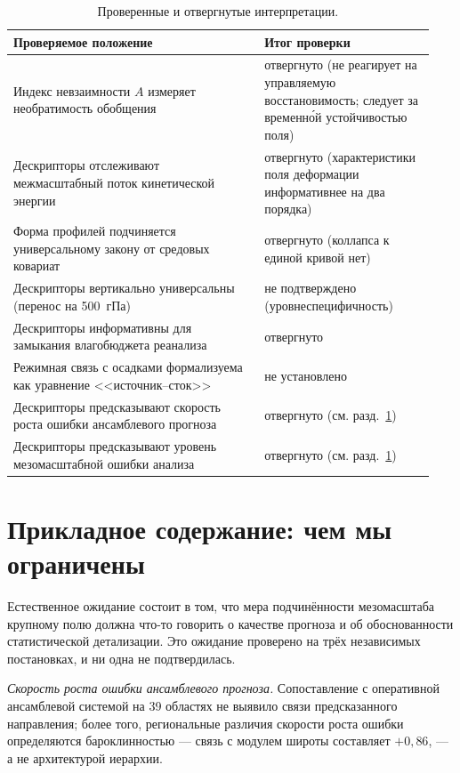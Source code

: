 \documentclass[11pt,a4paper]{article}
\begin{document}
\begin{table}[t]
\centering
\caption{Проверенные и отвергнутые интерпретации.}
\label{tab:negative}
\small
\begin{tabular}{@{}p{0.56\linewidth}p{0.38\linewidth}@{}}
\toprule
Проверяемое положение & Итог проверки\\
\midrule
Индекс невзаимности $A$ измеряет необратимость обобщения & отвергнуто (не реагирует на управляемую восстановимость; следует за временн\'{о}й устойчивостью поля)\\
Дескрипторы отслеживают межмасштабный поток кинетической энергии & отвергнуто (характеристики поля деформации информативнее на два порядка)\\
Форма профилей подчиняется универсальному закону от средовых ковариат & отвергнуто (коллапса к единой кривой нет)\\
Дескрипторы вертикально универсальны (перенос на 500~гПа) & не подтверждено (уровнеспецифичность)\\
Дескрипторы информативны для замыкания влагобюджета реанализа & отвергнуто\\
Режимная связь с осадками формализуема как уравнение <<источник--сток>> & не установлено\\
Дескрипторы предсказывают скорость роста ошибки ансамблевого прогноза & отвергнуто (см. разд.~\ref{sec:applied})\\
Дескрипторы предсказывают уровень мезомасштабной ошибки анализа & отвергнуто (см. разд.~\ref{sec:applied})\\
\bottomrule
\end{tabular}
\end{table}

\section{Прикладное содержание: чем мы ограничены}
\label{sec:applied}

Естественное ожидание состоит в том, что мера подчинённости мезомасштаба крупному полю должна что-то говорить о качестве прогноза и об обоснованности статистической детализации. Это ожидание проверено на трёх независимых постановках, и ни одна не подтвердилась.

\emph{Скорость роста ошибки ансамблевого прогноза.} Сопоставление с оперативной ансамблевой системой на 39 областях не выявило связи предсказанного направления; более того, региональные различия скорости роста ошибки определяются бароклинностью --- связь с модулем широты составляет $+0{,}86$, --- а не архитектурой иерархии.
\end{document}
